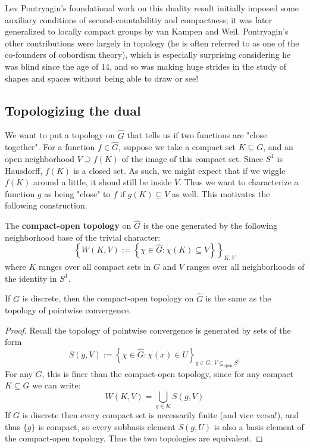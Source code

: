 \documentclass[11pt, x11names]{book}
\newcommand{\set}[1]{\left\{ #1 \right\}}
\renewcommand{\hat}{\widehat}
\begin{document}
\begin{remark}
    Lev Pontryagin's foundational work on this duality result initially imposed some auxiliary conditions of second-countabilitiy and compactness; it was later generalized to locally compact groups by van Kampen and Weil. Pontryagin's other contributions were largely in topology (he is often referred to as one of the co-founders of cobordism theory), which is especially surprising considering he was blind since the age of 14, and so was making huge strides in the study of shapes and spaces without being able to draw or see!
\end{remark}

\subsection{Topologizing the dual}
\label{subsection: Topologizing the dual}

We want to put a topology on $\hat{G}$ that tells us if two functions are "close together".
For a function $f \in \hat{G}$, suppose we take a compact set $K \subseteq G$, and an open 
neighborhood $V \supseteq f(K)$ of the image of this compact set. Since $S^1$ is Hausdorff,
$f(K)$ is a closed set. As such, we might expect that if we wiggle $f(K)$ around a little, it
shoud still be inside $V$. Thus we want to characterize a function $g$ as being "close" to $f$
if $g(K) \subseteq V$ as well. This motivates the following construction.

\begin{defn}
The \textbf{compact-open topology} on $\hat{G}$ is the one generated by the following neighborhood base
of the trivial character:
\begin{equation*}
    \set{W(K, V) := \set{\chi \in \hat{G} : \chi(K) \subseteq V}}_{K, V}
\end{equation*}
where $K$ ranges over all compact sets in $G$ and $V$ ranges over all neighborhoods of the identity 
in $S^1$.
\end{defn}

\begin{prop}
\label{compact-open = ptwise convergence}
If $G$ is discrete, then  the compact-open topology on $\hat{G}$ is the same as the topology 
of pointwise convergence.
\end{prop}
\begin{proof}
Recall the topology of pointwise convergence is generated by sets of the form
\begin{equation*}
    S(g, V) := \set{\chi \in \hat{G} : \chi(x) \in U}_{g \in G; \ V \subseteq_{\textrm{open}} S^1}
\end{equation*}
For any $G$, this is finer than the compact-open topology, since for any compact $K \subseteq G$ we can write:
\begin{equation*}
    W(K, V) = \bigcup_{g \in K} S(g, V)
\end{equation*} 
If $G$ is discrete then every compact set is necessarily finite (and vice versa!), and thus $\{g\}$ is compact, so every subbasis element $S(g, U)$ is also a basis element of the compact-open topology. Thus the two topologies are equivalent.
\end{proof}
\end{document}
